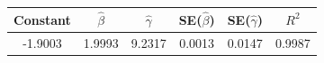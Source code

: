 \begin{tabular}{cccccc}
\toprule
Constant & $\hat{\beta}$ & $\hat{\gamma}$ & SE($\hat{\beta}$) & SE($\hat{\gamma}$) & $R^2$ \\
\midrule
-1.9003 & 1.9993 & 9.2317 & 0.0013 & 0.0147 & 0.9987 \\
\bottomrule
\end{tabular}